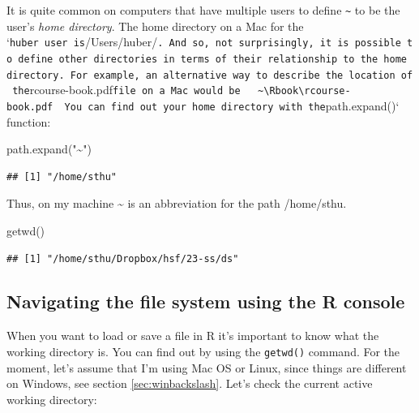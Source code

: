 \documentclass[
  12pt,
  oneside]{book}
\newenvironment{Shaded}{\begin{snugshade}}{\end{snugshade}}
\newcommand{\FunctionTok}[1]{\textcolor[rgb]{0.00,0.00,0.00}{#1}}
\newcommand{\NormalTok}[1]{#1}
\newcommand{\StringTok}[1]{\textcolor[rgb]{0.31,0.60,0.02}{#1}}
\begin{document}
It is quite common on computers that have multiple users to define \texttt{\textasciitilde{}} to be the user's \emph{home directory}. The home directory on a Mac for the `\texttt{huber\textquotesingle{}\textquotesingle{}\ user\ is}/Users/huber/\texttt{.\ And\ so,\ not\ surprisingly,\ it\ is\ possible\ to\ define\ other\ directories\ in\ terms\ of\ their\ relationship\ to\ the\ home\ directory.\ For\ example,\ an\ alternative\ way\ to\ describe\ the\ location\ of\ the}rcourse-book.pdf\texttt{file\ on\ a\ Mac\ would\ be\ \ \textasciigrave{}\textasciigrave{}\textasciigrave{}\ \textasciitilde{}\textbackslash{}Rbook\textbackslash{}rcourse-book.pdf\ \textasciigrave{}\textasciigrave{}\textasciigrave{}\ You\ can\ find\ out\ your\ home\ directory\ with\ the}path.expand()` function:

\begin{Shaded}
\begin{Highlighting}[]
\FunctionTok{path.expand}\NormalTok{(}\StringTok{"\textasciitilde{}"}\NormalTok{)}
\end{Highlighting}
\end{Shaded}

\begin{verbatim}
## [1] "/home/sthu"
\end{verbatim}

Thus, on my machine \textasciitilde{} is an abbreviation for the path /home/sthu.

\begin{Shaded}
\begin{Highlighting}[]
\FunctionTok{getwd}\NormalTok{()}
\end{Highlighting}
\end{Shaded}

\begin{verbatim}
## [1] "/home/sthu/Dropbox/hsf/23-ss/ds"
\end{verbatim}

\hypertarget{sec:navigationR}{%
\subsection{Navigating the file system using the R console}\label{sec:navigationR}}

When you want to load or save a file in R it's important to know what the working directory is. You can find out by using the \texttt{getwd()} command. For the moment, let's assume that I'm using Mac OS or Linux, since things are different on Windows, see section \ref{sec:winbackslash}.
Let's check the current active working directory:
\end{document}
